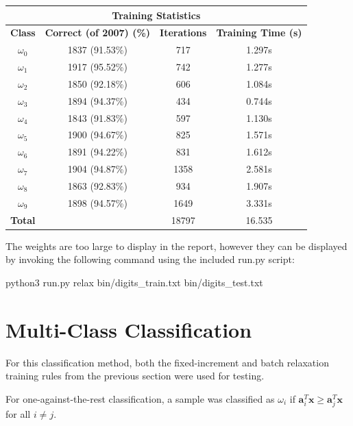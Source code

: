 \documentclass{article}
\newcommand{\mbf}[1]{\ensuremath{\mathbf{#1}}}
\begin{document}
\begin{center}
\begin{tabular}{|c|c|c|c|}
\hline\multicolumn{4}{|c|}{{\bf Training Statistics}}\\
\hline{\bf Class} & {\bf Correct (of 2007) (\%)} & {\bf Iterations} & {\bf Training Time (s)}\\\hline
$\omega_0$ & 1837 (91.53\%) & 717 & 1.297s \\
$\omega_1$ & 1917 (95.52\%) & 742 & 1.277s \\
$\omega_2$ & 1850 (92.18\%) & 606 & 1.084s \\
$\omega_3$ & 1894 (94.37\%) & 434 & 0.744s \\
$\omega_4$ & 1843 (91.83\%) & 597 & 1.130s \\
$\omega_5$ & 1900 (94.67\%) & 825 & 1.571s \\
$\omega_6$ & 1891 (94.22\%) & 831 & 1.612s \\
$\omega_7$ & 1904 (94.87\%) & 1358 & 2.581s \\
$\omega_8$ & 1863 (92.83\%) & 934 & 1.907s \\
$\omega_9$ & 1898 (94.57\%) & 1649 & 3.331s \\
\hline
{\bf Total} & ~ & 18797 & 16.535\\
\hline
\end{tabular}
\end{center}

The weights are too large to display in the report, however they can be displayed by invoking the following command using the included run.py script:
\begin{center}
python3 run.py relax bin/digits\_train.txt bin/digits\_test.txt
\end{center}

\section{Multi-Class Classification}
For this classification method, both the fixed-increment and batch relaxation training rules from the previous section were used for testing.

For one-against-the-rest classification, a sample was classified as $\omega_i$ if $\mbf{a}^T_i \mbf{x} \geq \mbf{a}^T_j \mbf{x}$ for all $i \neq j$.
\end{document}
